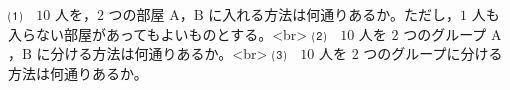 ⑴　$10$ 人を，$2$ つの部屋 $\mathrm{A}$，$\mathrm{B}$ に入れる方法は何通りあるか。ただし，$1$ 人も入らない部屋があってもよいものとする。<br>
⑵　$10$ 人を $2$ つのグループ $\mathrm{A}$，$\mathrm{B}$ に分ける方法は何通りあるか。<br>
⑶　$10$ 人を $2$ つのグループに分ける方法は何通りあるか。
